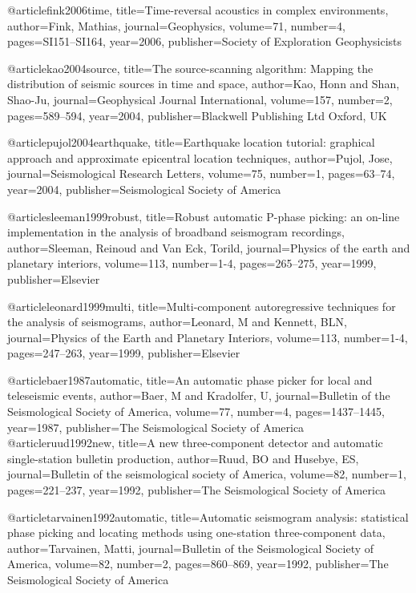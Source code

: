 @article{fink2006time,
  title={Time-reversal acoustics in complex environments},
  author={Fink, Mathias},
  journal={Geophysics},
  volume={71},
  number={4},
  pages={SI151--SI164},
  year={2006},
  publisher={Society of Exploration Geophysicists}
}

@article{kao2004source,
  title={The source-scanning algorithm: Mapping the distribution of seismic sources in time and space},
  author={Kao, Honn and Shan, Shao-Ju},
  journal={Geophysical Journal International},
  volume={157},
  number={2},
  pages={589--594},
  year={2004},
  publisher={Blackwell Publishing Ltd Oxford, UK}
}

@article{pujol2004earthquake,
  title={Earthquake location tutorial: graphical approach and approximate epicentral location techniques},
  author={Pujol, Jose},
  journal={Seismological Research Letters},
  volume={75},
  number={1},
  pages={63--74},
  year={2004},
  publisher={Seismological Society of America}
}


@article{sleeman1999robust,
  title={Robust automatic P-phase picking: an on-line implementation in the analysis of broadband seismogram recordings},
  author={Sleeman, Reinoud and Van Eck, Torild},
  journal={Physics of the earth and planetary interiors},
  volume={113},
  number={1-4},
  pages={265--275},
  year={1999},
  publisher={Elsevier}
}

@article{leonard1999multi,
  title={Multi-component autoregressive techniques for the analysis of seismograms},
  author={Leonard, M and Kennett, BLN},
  journal={Physics of the Earth and Planetary Interiors},
  volume={113},
  number={1-4},
  pages={247--263},
  year={1999},
  publisher={Elsevier}
}

@article{baer1987automatic,
  title={An automatic phase picker for local and teleseismic events},
  author={Baer, M and Kradolfer, U},
  journal={Bulletin of the Seismological Society of America},
  volume={77},
  number={4},
  pages={1437--1445},
  year={1987},
  publisher={The Seismological Society of America}
}
@article{ruud1992new,
  title={A new three-component detector and automatic single-station bulletin production},
  author={Ruud, BO and Husebye, ES},
  journal={Bulletin of the seismological society of America},
  volume={82},
  number={1},
  pages={221--237},
  year={1992},
  publisher={The Seismological Society of America}
}

@article{tarvainen1992automatic,
  title={Automatic seismogram analysis: statistical phase picking and locating methods using one-station three-component data},
  author={Tarvainen, Matti},
  journal={Bulletin of the Seismological Society of America},
  volume={82},
  number={2},
  pages={860--869},
  year={1992},
  publisher={The Seismological Society of America}
}


